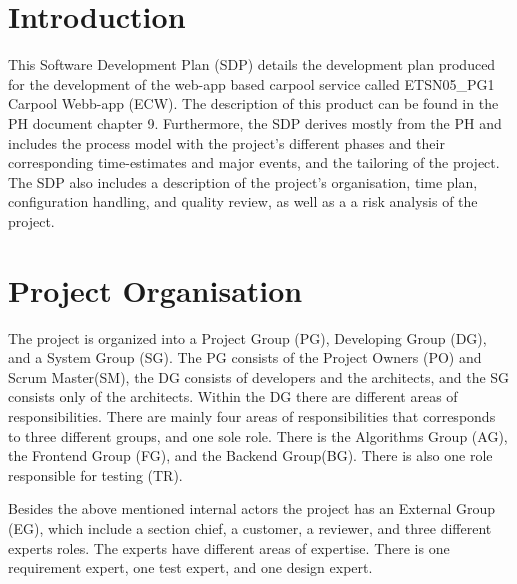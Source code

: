 \documentclass{article}
\begin{document}
\tableofcontents
\newpage

\section{Introduction}
This Software Development Plan (SDP) details the development plan produced for the development of the web-app based carpool service called ETSN05\_PG1 Carpool Webb-app (ECW). The description of this product can be found in the PH document chapter 9. Furthermore, the SDP derives mostly from the PH and includes the process model with the project's different phases and their corresponding time-estimates and major events, and the tailoring of the project. The SDP also includes a description of the project's organisation, time plan, configuration handling, and quality review, as well as a a risk analysis of the project. 

\section{Project Organisation}
The project is organized into a Project Group (PG), Developing Group (DG), and a System Group (SG). The PG consists of the Project Owners (PO) and Scrum Master(SM), the DG consists of developers and the architects, and the SG consists only of the architects. Within the DG there are different areas of responsibilities. There are mainly four areas of responsibilities that corresponds to three different groups, and one sole role. There is the Algorithms Group (AG), the Frontend Group (FG), and the Backend Group(BG). There is also one role responsible for testing (TR). 

Besides the above mentioned internal actors the project has an External Group (EG), which include a section chief, a customer, a reviewer, and three different experts roles. The experts have different areas of expertise. There is one requirement expert, one test expert, and one design expert.
\end{document}

